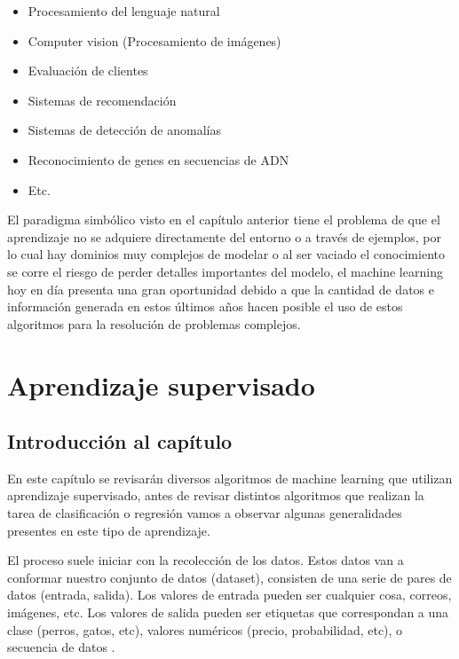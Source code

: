 \documentclass[11pt,fleqn]{book} %
\begin{document}
\begin{itemize}
\item Procesamiento del lenguaje natural
\item Computer vision (Procesamiento de imágenes)
\item Evaluación de clientes
\item Sistemas de recomendación
\item Sistemas de detección de anomalías
\item Reconocimiento de genes en secuencias de ADN
\item Etc.
\end{itemize}

El paradigma simbólico visto en el capítulo anterior tiene el problema de que el aprendizaje no se adquiere directamente del entorno o a través de ejemplos, por lo cual hay dominios muy complejos de modelar o al ser vaciado el conocimiento se corre el riesgo de perder detalles importantes del modelo, el machine learning hoy en día presenta una gran oportunidad debido a que la cantidad de datos e información generada en estos últimos años hacen posible el uso de estos algoritmos para la resolución de problemas complejos.


\chapter{Aprendizaje supervisado}

\section{Introducción al capítulo} 

En este capítulo se revisarán diversos algoritmos de machine learning que utilizan aprendizaje supervisado, antes de revisar distintos algoritmos que realizan la tarea de clasificación o regresión vamos a observar algunas generalidades presentes en este tipo de aprendizaje.

El proceso suele iniciar con la recolección de los datos. Estos datos van a conformar nuestro conjunto de datos (dataset), consisten de una serie de pares de datos (entrada, salida). Los valores de entrada pueden ser cualquier cosa, correos, imágenes, etc. Los valores de salida pueden ser etiquetas que correspondan a una clase (perros, gatos, etc), valores numéricos (precio, probabilidad, etc), o secuencia de datos \cite{burkov2019hundred}.
\end{document}
